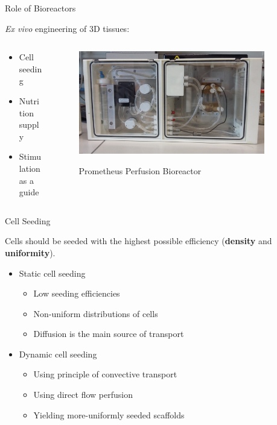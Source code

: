 \documentclass[11pt,t]{beamer}
\begin{document}
\begin{frame}[fragile]{Role of Bioreactors}  

\emph{Ex vivo} engineering of 3D tissues:

	\begin{columns}[t]
		\begin{column}{.45\textwidth}
\begin{itemize}
\item
Cell seeding
\item
Nutrition supply
\item
Stimulation as a guide
\end{itemize}
		\end{column}
		\begin{column}{.55\textwidth}
			\vspace{-10pt}
			\begin{figure}
			\centering
			\includegraphics[width=0.9\textwidth]{prometheus}
			
			\footnotesize	Prometheus Perfusion Bioreactor
			\end{figure}
		\end{column}
	\end{columns}	
	
\end{frame}


\begin{frame}[fragile]{Cell Seeding}  

Cells should be seeded with the
highest possible efficiency (\textbf{density} and \textbf{uniformity}).
\begin{itemize}
\item
Static cell seeding
\begin{itemize}
\item
Low seeding efficiencies
\item
Non-uniform distributions of cells
\item
Diffusion is the main source of transport
\end{itemize}
\item
Dynamic cell seeding
\begin{itemize}
\item
Using principle of convective transport
\item
Using direct flow perfusion
\item
Yielding more-uniformly seeded scaffolds
\end{itemize}
\end{itemize}
\end{frame}
\end{document}
